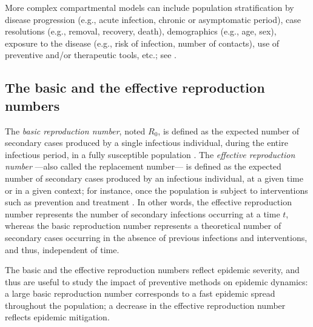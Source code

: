 More complex compartmental models can include population stratification by disease progression (e.g., acute infection, chronic or asymptomatic period), case resolutions (e.g., removal, recovery, death), demographics (e.g., age, sex), exposure to the disease (e.g., risk of infection, number of contacts), use of preventive and/or therapeutic tools, etc.; see \cite[]{Hethcote2000}. 


\subsection{The basic and the effective reproduction numbers}
\label{Intro:ReproductionNumbers}

The \textit{basic reproduction number}, noted $R_0$, is defined as the expected number of secondary cases produced by a single infectious individual, during the entire infectious period, in a fully susceptible population \cite[]{Anderson1991,Heesterbeek2002}. The \textit{effective reproduction number} ---also called the replacement number--- is defined as the expected number of secondary cases produced by an infectious individual, at a given time or in a given context; for instance, once the population is subject to interventions such as prevention and treatment \cite[]{Ridenhour2018,VanDenDriessche2008,VanDenDriessche2002,Hethcote2000}. In other words, the effective reproduction number represents the number of secondary infections occurring at a time $t$, whereas the basic reproduction number represents a theoretical number of secondary cases occurring in the absence of previous infections and interventions, and thus, independent of time.

The basic and the effective reproduction numbers reflect epidemic severity, and thus are useful to study the impact of preventive methods on epidemic dynamics: a large basic reproduction number corresponds to a fast epidemic spread throughout the population; a decrease in the effective reproduction number reflects epidemic mitigation. 

